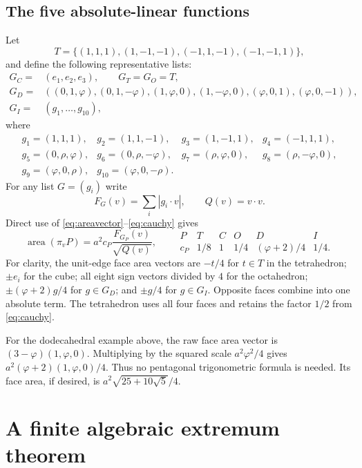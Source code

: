 \documentclass[11pt,a4paper]{article}
\newcommand{\ph}{\varphi}
\newcommand{\rr}{\rho}
\newcommand{\abs}[1]{\left|#1\right|}
\newcommand{\area}{\operatorname{area}}
\begin{document}
\subsection{The five absolute-linear functions}\label{sec:generators}
Let
\[
 T=\{(1,1,1),(1,-1,-1),(-1,1,-1),(-1,-1,1)\},
\]
and define the following representative lists:
\begin{align*}
 G_C={}&(e_1,e_2,e_3),\qquad G_T=G_O=T,\\
 G_D={}&((0,1,\ph),(0,1,-\ph),(1,\ph,0),(1,-\ph,0),(\ph,0,1),(\ph,0,-1)),\\
 G_I={}&(g_1,\ldots,g_{10}),
\end{align*}
where
\begin{equation}\label{eq:icolonormals}
\begin{array}{llll}
g_1=(1,1,1),&g_2=(1,1,-1),&g_3=(1,-1,1),&g_4=(-1,1,1),\\
g_5=(0,\rr,\ph),&g_6=(0,\rr,-\ph),&g_7=(\rr,\ph,0),&g_8=(\rr,-\ph,0),\\
g_9=(\ph,0,\rr),&g_{10}=(\ph,0,-\rr).
\end{array}
\end{equation}
For any list $G=(g_i)$ write
\[
 F_G(v)=\sum_i\abs{g_i\cdot v},\qquad Q(v)=v\cdot v.
\]
Direct use of \eqref{eq:areavector}--\eqref{eq:cauchy} gives
\begin{equation}\label{eq:area-factor}
 \area(\pi_v P)=a^2c_P\frac{F_{G_P}(v)}{\sqrt{Q(v)}},\qquad
 \begin{array}{c|ccccc}
 P&T&C&O&D&I\\\hline
 c_P&1/8&1&1/4&(\ph+2)/4&1/4.
 \end{array}
\end{equation}
For clarity, the unit-edge face area vectors are $-t/4$ for $t\in T$ in the tetrahedron; $\pm e_i$ for the cube; all eight sign vectors divided by $4$ for the octahedron; $\pm(\ph+2)g/4$ for $g\in G_D$; and $\pm g/4$ for $g\in G_I$. Opposite faces combine into one absolute term. The tetrahedron uses all four faces and retains the factor $1/2$ from \eqref{eq:cauchy}.

For the dodecahedral example above, the raw face area vector is $(3-\ph)(1,\ph,0)$. Multiplying by the squared scale $a^2\ph^2/4$ gives $a^2(\ph+2)(1,\ph,0)/4$. Thus no pentagonal trigonometric formula is needed. Its face area, if desired, is $a^2\sqrt{25+10\sqrt5}/4$.

\section{A finite algebraic extremum theorem}\label{sec:finite}
\end{document}
